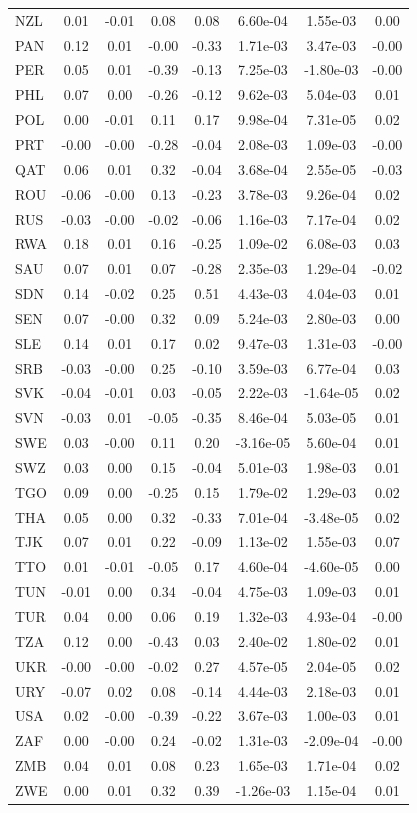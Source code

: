 \documentclass{article}
\begin{document}
\begin{table}[tbp]
\begin{tabularx}{\linewidth}{@{}lCCCCCCC@{}}
NZL&0.01&-0.01&0.08&0.08&6.60e-04&1.55e-03&0.00 \tabularnewline
PAN&0.12&0.01&-0.00&-0.33&1.71e-03&3.47e-03&-0.00 \tabularnewline
PER&0.05&0.01&-0.39&-0.13&7.25e-03&-1.80e-03&-0.00 \tabularnewline
PHL&0.07&0.00&-0.26&-0.12&9.62e-03&5.04e-03&0.01 \tabularnewline
POL&0.00&-0.01&0.11&0.17&9.98e-04&7.31e-05&0.02 \tabularnewline
PRT&-0.00&-0.00&-0.28&-0.04&2.08e-03&1.09e-03&-0.00 \tabularnewline
QAT&0.06&0.01&0.32&-0.04&3.68e-04&2.55e-05&-0.03 \tabularnewline
ROU&-0.06&-0.00&0.13&-0.23&3.78e-03&9.26e-04&0.02 \tabularnewline
RUS&-0.03&-0.00&-0.02&-0.06&1.16e-03&7.17e-04&0.02 \tabularnewline
RWA&0.18&0.01&0.16&-0.25&1.09e-02&6.08e-03&0.03 \tabularnewline
SAU&0.07&0.01&0.07&-0.28&2.35e-03&1.29e-04&-0.02 \tabularnewline
SDN&0.14&-0.02&0.25&0.51&4.43e-03&4.04e-03&0.01 \tabularnewline
SEN&0.07&-0.00&0.32&0.09&5.24e-03&2.80e-03&0.00 \tabularnewline
SLE&0.14&0.01&0.17&0.02&9.47e-03&1.31e-03&-0.00 \tabularnewline
SRB&-0.03&-0.00&0.25&-0.10&3.59e-03&6.77e-04&0.03 \tabularnewline
SVK&-0.04&-0.01&0.03&-0.05&2.22e-03&-1.64e-05&0.02 \tabularnewline
SVN&-0.03&0.01&-0.05&-0.35&8.46e-04&5.03e-05&0.01 \tabularnewline
SWE&0.03&-0.00&0.11&0.20&-3.16e-05&5.60e-04&0.01 \tabularnewline
SWZ&0.03&0.00&0.15&-0.04&5.01e-03&1.98e-03&0.01 \tabularnewline
TGO&0.09&0.00&-0.25&0.15&1.79e-02&1.29e-03&0.02 \tabularnewline
THA&0.05&0.00&0.32&-0.33&7.01e-04&-3.48e-05&0.02 \tabularnewline
TJK&0.07&0.01&0.22&-0.09&1.13e-02&1.55e-03&0.07 \tabularnewline
TTO&0.01&-0.01&-0.05&0.17&4.60e-04&-4.60e-05&0.00 \tabularnewline
TUN&-0.01&0.00&0.34&-0.04&4.75e-03&1.09e-03&0.01 \tabularnewline
TUR&0.04&0.00&0.06&0.19&1.32e-03&4.93e-04&-0.00 \tabularnewline
TZA&0.12&0.00&-0.43&0.03&2.40e-02&1.80e-02&0.01 \tabularnewline
UKR&-0.00&-0.00&-0.02&0.27&4.57e-05&2.04e-05&0.02 \tabularnewline
URY&-0.07&0.02&0.08&-0.14&4.44e-03&2.18e-03&0.01 \tabularnewline
USA&0.02&-0.00&-0.39&-0.22&3.67e-03&1.00e-03&0.01 \tabularnewline
ZAF&0.00&-0.00&0.24&-0.02&1.31e-03&-2.09e-04&-0.00 \tabularnewline
ZMB&0.04&0.01&0.08&0.23&1.65e-03&1.71e-04&0.02 \tabularnewline
ZWE&0.00&0.01&0.32&0.39&-1.26e-03&1.15e-04&0.01 \tabularnewline
\bottomrule 

\end{tabularx}
\end{table}
\end{document}
